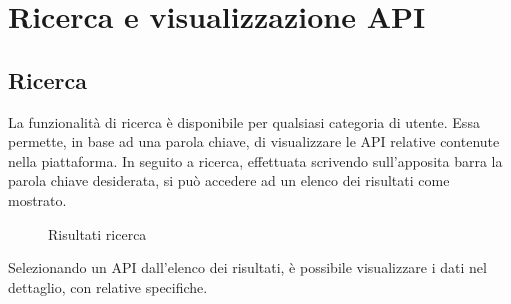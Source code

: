 \newpage
\section{Ricerca e visualizzazione API}

\subsection{Ricerca}
La funzionalità di ricerca è disponibile per qualsiasi categoria di utente. Essa permette, in base ad una parola chiave, di visualizzare le API relative contenute nella piattaforma. In seguito a ricerca, effettuata scrivendo sull'apposita barra la parola chiave desiderata, si può accedere ad un elenco dei risultati come mostrato.

\label{Risultati ricerca}
\begin{figure}[H]
	\centering
	\caption{Risultati ricerca}
\end{figure}

Selezionando un API dall'elenco dei risultati, è possibile visualizzare i dati nel dettaglio, con relative specifiche. 

